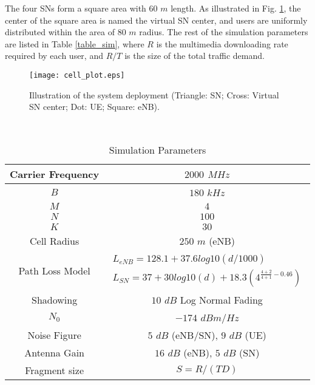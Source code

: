 \documentclass[journal,12pt,onecolumn]{IEEEtran}
\begin{document}
The four SNs form a square area with $60$ $m$ length. As illustrated in Fig. \ref{SCENARIO_PLOT}, the center of the square area is named the virtual SN center, and users are uniformly distributed within the area of $80$ $m$ radius. The rest of the simulation parameters are listed in Table \ref{table_sim}, where $R$ is the multimedia downloading rate required by each user, and $R/T$ is the size of the total traffic demand.

\begin{figure}[t]
\centering
\texttt{[image: cell\_plot.eps]}\caption{Illustration of the system deployment (Triangle: SN; Cross: Virtual SN center; Dot: UE; Square: eNB).}
\label{SCENARIO_PLOT}
\end{figure}



\begin{table}[ht]
\caption{Simulation Parameters}\label{table_sim} \centering\  \begin{tabular}{|c|c|}
\hline
Carrier Frequency& $2000$ $MHz$\\
\hline
$B$ &$180$ $kHz$\\
\hline
$M$&$4$\\
\hline
$N$&$100$\\\hline
$K$&$30$\\
\hline
Cell Radius& $250$ $m$ (eNB)\\
\hline
Path Loss Model& $\begin{array}{l}
L_{eNB} = 128.1 + 37.6log10 ( d/1000 )\\
L_{SN} =37+30log10(d)+18.3( 4^{\frac{4+2}{4+1}-0.46})
\end{array}$\\
\hline
Shadowing & $10$ $dB$ Log Normal Fading\\
\hline
$N_0$ & $-174$ $dBm/Hz$\\
\hline
Noise Figure &$5$ $dB$ (eNB/SN), $9$ $dB$ (UE)\\
\hline
Antenna Gain & $16$ $dB$ (eNB), $5$ $dB$ (SN)\\
\hline 
Fragment size& $S={R}/({TD})$\\
\hline
\end{tabular}
\label{tab_2}
\end{table}
\end{document}
